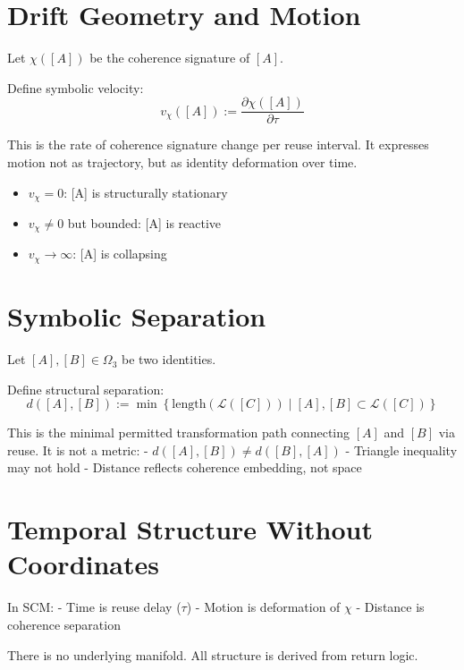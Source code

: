 \section{Drift Geometry and Motion}

Let $\chi([A])$ be the coherence signature of $[A]$.

Define symbolic velocity:
\begin{equation} \label{eq:symbolic-velocity}
v_\chi([A]) := \frac{\partial \chi([A])}{\partial \tau}
\end{equation}

This is the rate of coherence signature change per reuse interval. It expresses motion not as trajectory, but as identity deformation over time.

\begin{itemize}
    \item $v_\chi = 0$: [A] is structurally stationary
    \item $v_\chi \ne 0$ but bounded: [A] is reactive
    \item $v_\chi \to \infty$: [A] is collapsing
\end{itemize}

\section{Symbolic Separation}

Let $[A], [B] \in \Omega_3$ be two identities.

Define structural separation:
\begin{equation} \label{eq:separation}
d([A], [B]) := \min \left\{ \text{length}(\mathcal{L}([C])) \mid [A], [B] \subset \mathcal{L}([C]) \right\}
\end{equation}

This is the minimal permitted transformation path connecting $[A]$ and $[B]$ via reuse. It is not a metric:
- $d([A], [B]) \ne d([B], [A])$
- Triangle inequality may not hold
- Distance reflects coherence embedding, not space

\section{Temporal Structure Without Coordinates}

In SCM:
- Time is reuse delay ($\tau$)
- Motion is deformation of $\chi$
- Distance is coherence separation

There is no underlying manifold. All structure is derived from return logic.

